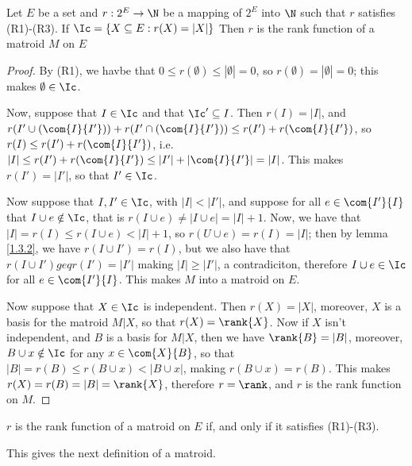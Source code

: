 \begin{theorem}\label{1.3.3}
    Let $E$ be a set and $r:2^E \rightarrow \N$ be a mapping of $2^E$ into
    $\N$ such that $r$ satisfies (R1)-(R3). If $\Ic=\{X \subseteq E :
    r(X)=|X|\}$ Then $r$ is the rank function of a matroid $M$ on $E$
\end{theorem}
\begin{proof}
    By (R1), we havbe that $0 \leq r(\emptyset) \leq |\emptyset|=0$, so
    $r(\emptyset)=|\emptyset|=0$; this makes $\emptyset \in \Ic$.

    Now, suppose that $I \in \Ic$ and that  $\Ic' \subseteq I$. Then
    $r(I)=|I|$, and $r(I' \cup (\com{I}{I'}))+r(I' \cap (\com{I}{I'})) \leq
    r(I')+r(\com{I}{I'})$, so $r(I) \leq r(I')+r(\com{I}{I'})$, i.e. $|I| \leq
    r(I')+r(\com{I}{I'}) \leq |I'|+|\com{I}{I'}|=|I|$. This makes $r(I')=|I'|$,
    so that $I' \in \Ic$.

    Now suppose that $I,I' \in \Ic$, with  $|I|<|I'|$, and suppose for all $e
    \in \com{I'}{I}$ that $I \cup e \notin \Ic$, that is  $r(I \cup e) \neq |I
    \cup e|=|I|+1$. Now, we have that $|I|=r(I) \leq r(I \cup e)<|I|+1$, so $r(U
    \cup e)=r(I)=|I|$; then by lemma \ref{1.3.2}, we have $r(I \cup I')=r(I)$,
    but we also have that $r(I \cup I') geq r(I')=|I'|$ making $|I| \geq |I'|$,
    a contradiciton, therefore  $I \cup e \in \Ic$ for all  $e \in \com{I'}{I}$.
    This makes $M$ into a matroid on $E$.

    Now suppose that $X \in \Ic$ is independent. Then  $r(X)=|X|$, moreover, $X$
    is a basis for the matroid  $M|X$, so that  $r(X)=\rank{X}$. Now if $X$
    isn't independent, and  $B$ is a basis for  $M|X$, then we have
    $\rank{B}=|B|$, moreover, $B \cup x \notin \Ic$ for any  $x \in \com{X}{B}$,
    so that $|B|=r(B) \leq r(B \cup x)<|B \cup x|$, making $r(B \cup x)=r(B)$.
    This makes $r(X)=r(B)=|B|=\rank{X}$, therefore $r=\rank$, and  $r$ is the
    rank function on  $M$.
\end{proof}
\begin{corollary}
    $r$ is the rank function of a matroid on  $E$ if, and only if it satisfies
    (R1)-(R3).
\end{corollary}

This gives the next definition of a matroid.

